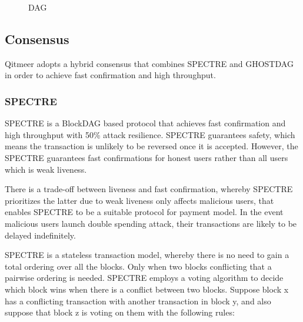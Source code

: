 \documentclass[a4paper,11pt]{article}
\begin{document}
\begin{figure}[hbt]
	\centerline{%
	}
\caption{DAG}
\end{figure}

\subsection{Consensus}

Qitmeer adopts a hybrid consensus that combines SPECTRE and GHOSTDAG in order to achieve fast confirmation and high throughput.

\subsubsection{SPECTRE}
SPECTRE\cite{SPECTRE} is a BlockDAG based protocol that achieves fast confirmation and high throughput with 50\% attack resilience. SPECTRE guarantees safety, which means the transaction is unlikely to be reversed once it is accepted. However, the SPECTRE guarantees fast confirmations for honest users rather than all users which is weak liveness.

There is a trade-off between liveness and fast confirmation, whereby SPECTRE prioritizes the latter due to weak liveness only affects malicious users, that enables SPECTRE to be a suitable protocol for payment model. In the event malicious users launch double spending attack, their transactions are likely to be delayed indefinitely.

SPECTRE is a stateless transaction model, whereby there is no need to gain a total ordering over all the blocks. Only when two blocks conflicting that a pairwise ordering is needed. SPECTRE employs a voting algorithm to decide which block wins when there is a conflict between two blocks. Suppose block x has a conflicting transaction with another transaction in block y, and also suppose that block z is voting on them with the following rules:
\end{document}
